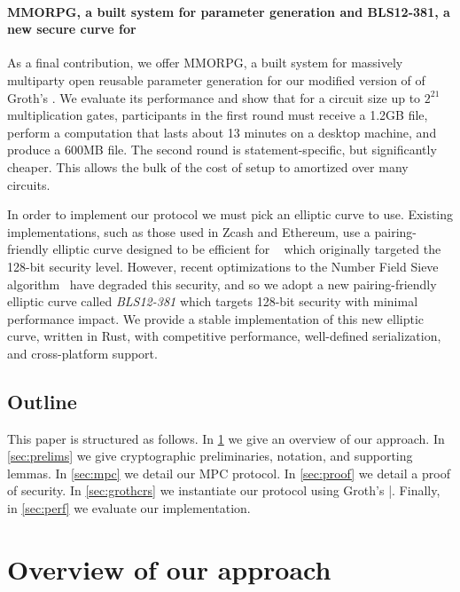 \documentclass{article}
\begin{document}
\paragraph*{MMORPG, a built system for {\snark} parameter generation and BLS12-381, a new secure curve for {\snarks}}
As a final  contribution, we offer MMORPG,  a built system for massively multiparty open  reusable parameter generation for our modified version of of Groth's {\snark}. We evaluate its performance and show that for a circuit size up to $2^{21}$ multiplication gates, participants in the first round must receive a 1.2GB file, perform a computation that lasts about 13 minutes on a desktop machine, and produce a 600MB file. The second round is statement-specific, but significantly cheaper. This allows the bulk of the cost of setup to amortized over many circuits.

In order to implement our protocol we must pick an elliptic curve to use. Existing {\snark} implementations, such as those  used in Zcash and Ethereum, use a pairing-friendly elliptic curve designed to be efficient for {\snarks}~\cite{cryptoeprint:2013:507} which originally targeted the 128-bit security level. However, recent optimizations to the Number Field Sieve algorithm~\cite{NFSOptimization} have degraded this security, and so we adopt a new pairing-friendly elliptic curve called \emph{BLS12-381} which targets 128-bit security with minimal performance impact. We provide a stable implementation of this new elliptic curve, written in Rust, with competitive performance, well-defined serialization, and cross-platform support.%

\subsection{Outline}
This paper is structured as follows. In \cref{sec:overview} we give an overview of our approach. In \cref{sec:prelims} we give cryptographic preliminaries, notation, and supporting lemmas. In \cref{sec:mpc} we detail our MPC protocol. In \cref{sec:proof} we detail a proof of security. In \cref{sec:grothcrs} we instantiate our protocol using Groth's {\snark}|. Finally, in \cref{sec:perf} we evaluate our implementation. 

\section{Overview of our approach}
\label{sec:overview}
\end{document}
